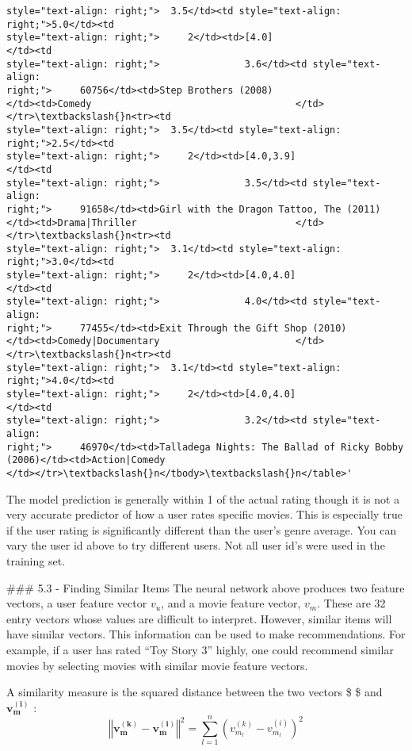 \documentclass[11pt]{article}
\begin{document}
\begin{tcolorbox}[breakable, size=fbox, boxrule=.5pt, pad at break*=1mm, opacityfill=0]
\begin{Verbatim}[commandchars=\\\{\}]
style="text-align: right;">  3.5</td><td style="text-align: right;">5.0</td><td
style="text-align: right;">     2</td><td>[4.0]                    </td><td
style="text-align: right;">               3.6</td><td style="text-align:
right;">     60756</td><td>Step Brothers (2008)
</td><td>Comedy                                    </td></tr>\textbackslash{}n<tr><td
style="text-align: right;">  3.5</td><td style="text-align: right;">2.5</td><td
style="text-align: right;">     2</td><td>[4.0,3.9]                </td><td
style="text-align: right;">               3.5</td><td style="text-align:
right;">     91658</td><td>Girl with the Dragon Tattoo, The (2011)
</td><td>Drama|Thriller                            </td></tr>\textbackslash{}n<tr><td
style="text-align: right;">  3.1</td><td style="text-align: right;">3.0</td><td
style="text-align: right;">     2</td><td>[4.0,4.0]                </td><td
style="text-align: right;">               4.0</td><td style="text-align:
right;">     77455</td><td>Exit Through the Gift Shop (2010)
</td><td>Comedy|Documentary                        </td></tr>\textbackslash{}n<tr><td
style="text-align: right;">  3.1</td><td style="text-align: right;">4.0</td><td
style="text-align: right;">     2</td><td>[4.0,4.0]                </td><td
style="text-align: right;">               3.2</td><td style="text-align:
right;">     46970</td><td>Talladega Nights: The Ballad of Ricky Bobby
(2006)</td><td>Action|Comedy
</td></tr>\textbackslash{}n</tbody>\textbackslash{}n</table>'
\end{Verbatim}
\end{tcolorbox}
        
    The model prediction is generally within 1 of the actual rating though
it is not a very accurate predictor of how a user rates specific movies.
This is especially true if the user rating is significantly different
than the user's genre average. You can vary the user id above to try
different users. Not all user id's were used in the training set.

    \#\#\# 5.3 - Finding Similar Items The neural network above produces two
feature vectors, a user feature vector \(v_u\), and a movie feature
vector, \(v_m\). These are 32 entry vectors whose values are difficult
to interpret. However, similar items will have similar vectors. This
information can be used to make recommendations. For example, if a user
has rated ``Toy Story 3'' highly, one could recommend similar movies by
selecting movies with similar movie feature vectors.

A similarity measure is the squared distance between the two vectors \$
\$ and \(\mathbf{v_m^{(i)}}\) :
\[\left\Vert \mathbf{v_m^{(k)}} - \mathbf{v_m^{(i)}}  \right\Vert^2 = \sum_{l=1}^{n}(v_{m_l}^{(k)} - v_{m_l}^{(i)})^2\tag{1}\]
\end{document}
